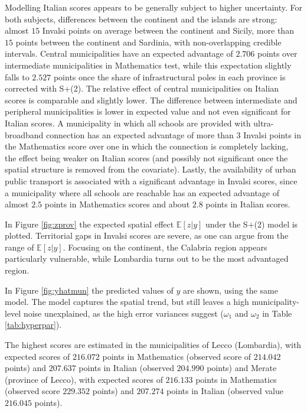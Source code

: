 \documentclass{book}
\begin{document}
Modelling Italian scores appears to be generally subject to higher uncertainty. For both subjects, differences between the continent and the islands are strong: almost $15$ Invalsi points on average between the continent and Sicily, more than $15$ points between the continent and Sardinia, with non-overlapping credible intervals. Central municipalities have an expected advantage of $2.706$ points over intermediate municipalities in Mathematics test, while this expectation slightly falls to $2.527$ points once the share of infrastructural poles in each province is corrected with S+(2). The relative effect of central municipalities on Italian scores is comparable and slightly lower. The difference between intermediate and peripheral municipalities is lower in expected value and not even significant for Italian scores. A municipality in which all schools are provided with ultra-broadband connection has an expected advantage of more than $3$ Invalsi points in the Mathematics score over one in which the connection is completely lacking, the effect being weaker on Italian scores (and possibly not significant once the spatial structure is removed from the covariate). Lastly, the availability of urban public transport is associated with a significant advantage in Invalsi scores, since a municipality where all schools are reachable has an expected advantage of almost $2.5$ points in Mathematics scores and about $2.8$ points in Italian scores. 

In Figure \ref {fig:zprov} the expected spatial effect $\mathbb{E}[z|y]$ under the S+(2) model is plotted. %
Territorial gaps in Invalsi scores are severe, as one can argue from the range of $\mathbb{E}[z|y]$. Focusing on the continent, the Calabria region appears particularly vulnerable, while Lombardia turns out to be the most advantaged region. 

In Figure \ref{fig:yhatmun} the predicted values of $y$ are shown, using the same model. The model captures the spatial trend, but still leaves a high municipality-level noise unexplained, as the high error variances suggest ($\omega_1$ and $\omega_2$ in Table \ref{tab:hyperpar}). 

The highest scores are estimated in the municipalities of Lecco (Lombardia), with expected scores of $216.072$ points in Mathematics (observed score of $214.042$ points) and $207.637$ points in Italian (observed $204.990$ points) and Merate (province of Lecco), with expected scores of $216.133$ points in Mathematics (observed score $229.352$ points) and $207.274$ points in Italian (observed value $216.045$ points). 
\end{document}
